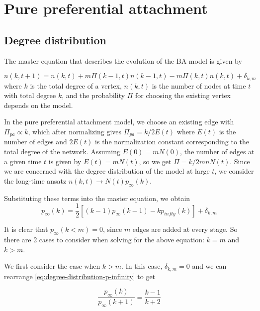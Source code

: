 \section{Pure preferential attachment}\label{section:pure-preferential-attachment}

\subsection{Degree distribution}\label{subsection:ppa-degree-distribution}
The master equation that describes the evolution of the BA model is given by

\begin{equation}
	n(k, t+1) = n(k, t) + m \Pi(k-1, t)n(k-1, t) - m \Pi(k, t)n(k, t) + \delta_{k,m}
	\label{eq:master}
\end{equation}
where $k$ is the total degree of a vertex, $n(k, t)$ is the number of nodes at time $t$ with total degree $k$, and the probability $\Pi$ for choosing the existing vertex depends on the model. 

In the pure preferential attachment model, we choose an existing edge with $\Pi_{pa} \propto k$, which after normalizing gives $\Pi_{pa} = k/ 2E(t)$ where $E(t)$ is the number of edges and $2E(t)$ is the normalization constant corresponding to the total degree of the network. Assuming $E(0) = mN(0)$, the number of edges at a given time $t$ is given by $E(t) = mN(t)$, so we get $\Pi = k / 2mnN(t)$. Since we are concerned with the degree distribution of the model at large $t$, we consider the long-time ansatz $n(k, t) \rightarrow N(t) p_{\infty}(k)$. 

Substituting these terms into the master equation, we obtain 
\begin{equation}
	p_{\infty}(k) = \frac{1}{2}[(k-1)p_{\infty}(k-1) - kp_{infty}(k)] + \delta_{k,m}
	\label{eq:degree-distribution-p-infinity}
\end{equation}

It is clear that $p_{\infty}(k < m) = 0$, since $m$ edges are added at every stage. So there are 2 cases to consider when solving for the above equation: $k = m$ and $k > m$. 

We first consider the case when $k > m$. In this case, $\delta_{k,m} = 0$ and we can rearrange \autoref{eq:degree-distribution-p-infinity} to get

\begin{equation}
	\frac{p_{\infty}(k)}{p_{\infty}(k+1)} = \frac{k-1}{k+2}
	\label{eq:p-infinity-k-greater-m}	
\end{equation}

